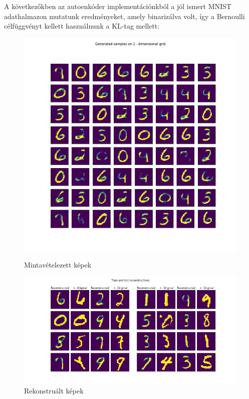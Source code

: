 \documentclass[12pt, english]{article}
\begin{document}
\vspace{4mm}

\par A következőkben az autoenkóder implementációnkból a jól ismert MNIST adathalmazon mutatunk eredményeket, amely binarizálva volt, így a Bernoulli célfüggvényt kellett használnunk a KL-tag mellett:

\vspace{4mm}

\begin{figure}[H] 
  \label{fig:auto_encoder_results} 
  \begin{minipage}{0.48\linewidth}
    \centering
    \includegraphics[width=.65\linewidth]{gen/generated_samples_mnist_auto_encoder.png} 
    \caption{Mintavételezett képek} 
  \end{minipage}\hfill
  \begin{minipage}{0.48\linewidth}
    \centering
    \includegraphics[width=.95\linewidth]{reco/reconstrunction_samples_mnist_auto_encoder.png} 
    \caption{Rekonstruált képek} 
  \end{minipage} 
\end{figure}
\end{document}
